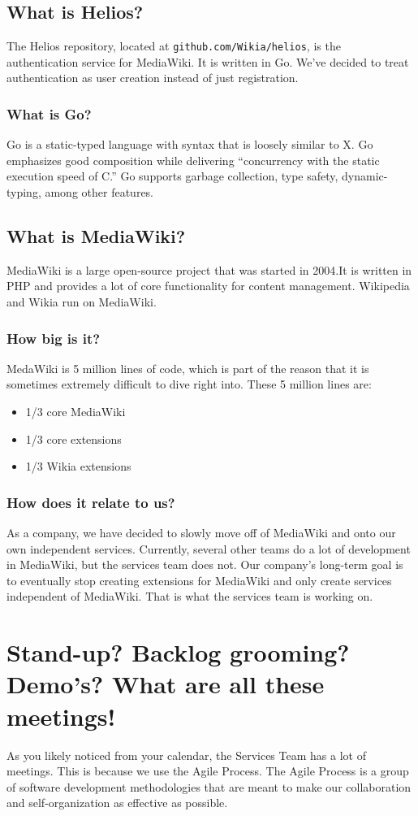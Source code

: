 \documentclass[oneside]{book}
\begin{document}
\section{What is Helios?}
The Helios repository, located at \texttt{github.com/Wikia/helios}, is the authentication service for MediaWiki. It is written in Go. We've decided to treat authentication as user creation instead of just registration.
\subsection{What is Go?}
Go is a static-typed language with syntax that is loosely similar to X. Go emphasizes good composition while delivering “concurrency with the static execution speed of C.” Go supports garbage collection, type safety, dynamic-typing, among other features. 
\section{What is MediaWiki?}
MediaWiki is a large open-source project that was started in 2004.It is written in PHP and provides a lot of core functionality for content management. Wikipedia and Wikia run on MediaWiki. 
\subsection{How big is it?}
MedaWiki is 5 million lines of code, which is part of the reason that it is sometimes extremely difficult to dive right into. These 5 million lines are:
\begin{itemize}
	\item 1/3 core MediaWiki
	\item 1/3 core extensions
	\item 1/3 Wikia extensions
\end{itemize}
\subsection{How does it relate to us?}
As a company, we have decided to slowly move off of MediaWiki and onto our own independent services. Currently, several other teams do a lot of development in MediaWiki, but the services team does not. Our company's long-term goal is to eventually stop creating extensions for MediaWiki and only create services independent of MediaWiki. That is what the services team is working on.
\chapter{Stand-up? Backlog grooming? Demo's? What are all these meetings!}
As you likely noticed from your calendar, the Services Team has a lot of meetings. This is because we use the Agile Process. The Agile Process is a group of software development methodologies that are meant to make our collaboration and self-organization as effective as possible.
\end{document}
